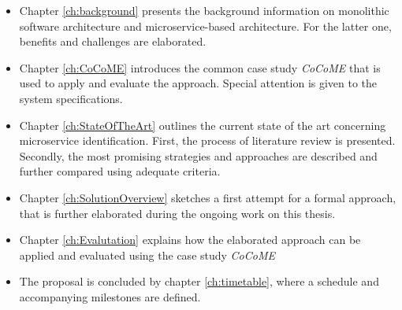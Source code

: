 \begin{itemize}
	\item  Chapter \ref{ch:background} presents the background information on monolithic software architecture and microservice-based architecture. For the latter one, benefits and challenges are elaborated. 
	\item Chapter \ref{ch:CoCoME} introduces the common case study \textit{CoCoME} that is used to apply and evaluate the approach. Special attention is given to the system specifications.
	\item Chapter \ref{ch:StateOfTheArt} outlines the current state of the art concerning microservice identification. First, the process of literature review is presented. Secondly, the most promising strategies and approaches are described and further compared using adequate criteria.
	\item Chapter \ref{ch:SolutionOverview} sketches a first attempt for a formal approach, that is further elaborated during the ongoing work on this thesis.
	\item Chapter \ref{ch:Evalutation} explains how the elaborated approach can be applied and evaluated using the case study \textit{CoCoME}
	\item The proposal is concluded by chapter \ref{ch:timetable}, where a schedule and accompanying milestones are defined.
\end{itemize}











